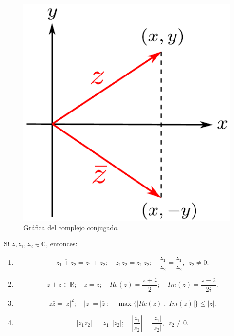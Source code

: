 \begin{figure}[H]
    \centering
    \includegraphics[scale=0.6]{Figuras/Conjugado.pdf}
    \caption{Gráfica del complejo conjugado.}
    \label{ComplejoConjugado}
\end{figure}

\begin{propo}\label{PropiedadesConjugadoModulo}
Si $z,z_1,z_2 \in \mathbb{C}$, entonces:

\begin{enumerate}
\item $$\overline{z_1 + z_2} = \overline{z_1} + \overline{z_2}; \quad \overline{z_1z_2} = \overline{z_1} \, \overline{z_2}; \quad \overline{\frac{z_1}{z_2}} = \frac{\overline{z_1}}{\overline{z_2}}, ~~ z_2 \neq 0.$$

\item $$z + \bar{z} \in \mathbb{R}; \quad \bar{\bar{z}} = z; \quad Re(z) = \frac{z + \bar{z}}{2};\quad Im(z)= \frac{z - \bar{z}}{2i}.$$

\item $$z \bar{z} = |z|^2; \quad |z| = |\bar{z}|; \quad \max\{|Re(z)|, |Im(z)|\} \leq |z|.$$

\item $$|z_1 z_2| = |z_1| \, |z_2|; \quad \left| \frac{z_1}{z_2} \right| = \frac{|z_1|}{|z_2|}, ~~ z_2 \neq 0.$$
\end{enumerate}

\end{propo}

